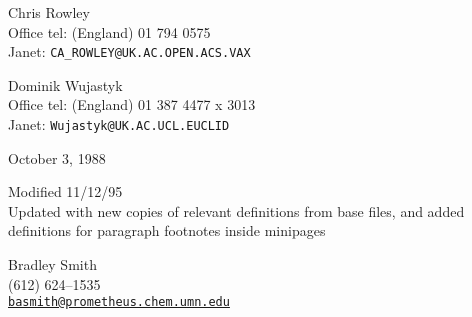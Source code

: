 \documentclass[DIV=9, pagesize=auto]{scrartcl}
\newcommand*{\mail}[1]{\href{mailto:#1}{\texttt{#1}}}
\begin{document}
\selectfont
Chris Rowley\\
Office tel: (England) 01 794 0575\\
Janet: \verb+CA_ROWLEY@UK.AC.OPEN.ACS.VAX+

Dominik Wujastyk\\
Office tel: (England) 01 387 4477 x 3013\\
Janet: \verb+Wujastyk@UK.AC.UCL.EUCLID+

October 3, 1988

\bigskip

Modified 11/12/95\\
Updated with new copies of relevant definitions from base files, and
added definitions for paragraph footnotes inside minipages

Bradley Smith\\
(612) 624--1535\\
\mail{basmith@prometheus.chem.umn.edu}
\end{document}
